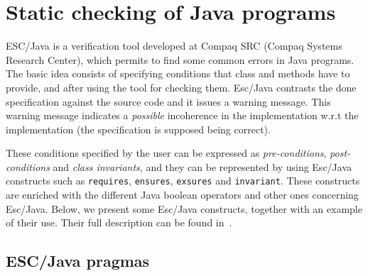 \documentclass[a4paper]{llncs}
\begin{document}
\section{Static checking of Java programs}
\label{SectStatic}


\label{SubSectEscJava}

ESC/Java is a verification tool developed at
Compaq SRC (Compaq Systems Research Center), which permits to find
some common errors in Java programs. The basic idea consists of
specifying conditions that class and methods have to
provide, and after using the tool for checking them. Esc/Java contrasts the
done specification against the source code and it issues a
warning message. This warning message indicates a \emph{possible}
incoherence in the implementation w.r.t the implementation (the specification
is supposed being correct).

These conditions specified by the user can be expressed as
\textit{pre-conditions}, \textit{post-conditions} and \textit{class
invariants}, and they can be represented by using Esc/Java constructs such as
\texttt{requires}, \texttt{ensures}, \texttt{exsures} and
\texttt{invariant}. These constructs are
enriched with the different Java boolean operators and other ones
concerning Esc/Java. Below, we present some
Esc/Java constructs, together with an example of their
use. Their full description can be found in~\cite{ESCJavaUrl}.






\subsection{\bf ESC/Java pragmas}
\end{document}
